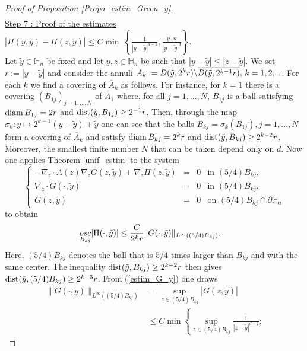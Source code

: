 \documentclass[11pt, reqno]{amsart}
\theoremstyle{definition}
\theoremstyle{remark}
\DeclareMathOperator*{\diam}{\textup{diam}}
\numberwithin{equation}{section}
\newcommand{\bs}{\symbol{92}}
\DeclareMathOperator*{\dist}{\textup{dist}}
\begin{document}
\begin{appendices}
\begin{proof}[Proof of \textup{Proposition \ref{Propo_estim_Green_y}}]
\begin{align*}
		\end{align*}
		\noindent \underline{Step 7 : Proof of the estimates} \,  $ | \Pi(y,\tilde{y}) -  \Pi(z,\tilde{y})| \leq C \min \;\left\{\frac{1 }{|y-\tilde{y}|^{d-1}}  ,\frac{\tilde{y}\cdot n }{|y-\tilde{y}|^{d}} \right\} .$\\
		Let $\tilde{y}\in\mathbb{H}_n$ be fixed and let $y,z\in\mathbb{H}_n$ be such that $|y-\tilde{y}|\leq |z-\tilde{y}|$. We set $r:=|y-\tilde{y}|$ and consider the annuli $A_k:=D(\tilde{y}, 2^kr)\bs \overline{D(\tilde{y},2^{k-1}r)},\, k=1,2, ..$. For each $k$ we find a covering of $\overline{A}_k$ as follows. For instance, for $k=1$ there  is a covering $(B_{1j})_{j=1,...,N}$ of $\overline{A}_1$   where,  for all $j=1,...,N$, 
		$B_{1j}$ is a ball satisfying $\diam B_{1j}= 2 r$ and $\dist(\tilde{y},  B_{1j})\geq 2^{-1} r$. Then, through the map $\sigma_k : y\mapsto 2^{k-1} (y-\tilde{y}) + \tilde{y}$  one can see that the balls $B_{kj}= \sigma_k(B_{ 1j}), j=1,...,N$ form a covering of $\overline{A}_k$  and satisfy $\diam B_{kj}= 2^k r$ and $\dist(\tilde{y},  B_{kj})\geq 2^{k-2} r$. Moreover, the smallest finite number $N$ that can be taken depend only on $d$.
		Now one applies Theorem \ref{unif_estim} to the system  
		\begin{equation}
			\left\{
			\begin{array}{rcll}
				-\nabla_z\cdot A (z)  \nabla_z G(z,\tilde{y}) +  \nabla_z \Pi(z,\tilde{y})&=& 0   &\mbox{in } (5/4) B_{kj} ,\\
				\nabla_z\cdot G(\cdot,\tilde{y})&=& 0   &\mbox{in }   (5/4)B_{kj},\\
				G(z,\tilde{y}) &=& 0  & \mbox{on } (5/4)	B_{kj}\cap \partial\mathbb{H}_n
			\end{array}
			\right. 
		\end{equation}
		to obtain
		\begin{align}
			\underset{B_{kj}}{\textup{osc}}	|  \Pi(\cdot,\tilde{y})|
			&\leq  \frac{C}{2^kr}  \|  G(\cdot,\tilde{y})\|_{L^{\infty}((5/4) B_{kj})}\label{estim_Linf_Bkj}.
		\end{align}
		Here, $(5/4) B_{kj}$ denotes the ball that is $5/4$ times larger than $ B_{kj}$ and with the same center. The inequality $\dist(\tilde{y},  B_{kj})\geq 2^{k-2} r$ then gives $\dist(\tilde{y},  (5/4)B_{kj})\geq 2^{k-3} r$. 
		From (\ref{estim_G_y}) one draws
		\begin{align*}
			\|  G(\cdot ,\tilde{y})\|_{L^{\infty}( (5/4)B_{kj})} &= \sup_{z\in{   (5/4)B_{kj}}} |G(z ,\tilde{y})|\nonumber \\
			&\leq  C \min \left\{ \sup_{z\in{  (5/4)B_{kj}}} \frac{1 }{|z-\tilde{y}|^{d-2}};	

\end{align*}
\end{proof}
\end{appendices}
\end{document}
